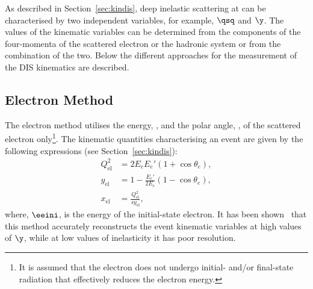 As described in Section~\ref{sec:kindis}, deep inelastic scattering at \hera can be characterised by two independent variables, for example, $\qsq$ and $\y$. The values of the kinematic variables can be determined from the components of the four-momenta of the scattered electron or the hadronic system or from the combination of the two. Below the different approaches for the measurement of the DIS kinematics are described.
\subsection{Electron Method}
\label{subsec:em}
The electron method utilises the energy, \eefin, and the polar angle, \thetae, of the scattered electron only\footnote{It is assumed that the electron does not undergo initial- and/or final-state radiation that effectively reduces the electron energy.}. The kinematic quantities characterising an event are given by the following expressions (see Section~\ref{sec:kindis}):
\begin{align}
	Q^2_\text{el} &= 2 E_e E_e' \left( 1 + \cos \theta_e \right),			\label{eq:q2el}							\\
	y_\text{el}      &= 1 - \frac{E_e'}{2 E_e}\left( 1 - \cos \theta_e \right),			\label{eq:yel} \\
	x_\text{el}      &= \frac{Q^2_\text{el}}{s y_\text{el}},			\label{eq:xel}
\end{align}
where, $\eeini$, is the energy of the initial-state electron. It has been shown~\cite{nim:a426:583} that this method accurately reconstructs the event kinematic variables at high values of $\y$, while at low values of inelasticity it has poor resolution.
